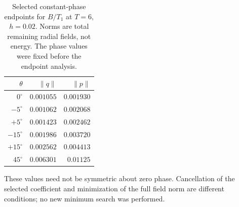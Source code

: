 \begin{table}[htbp]\centering\small
\caption{Selected constant-phase endpoints for $B/T_1$ at $T=6$,
$h=0.02$. Norms are total remaining radial fields, not energy.
The phase values were fixed before the endpoint analysis.}
\label{tab:phase-selected}
\begin{tabular}{rrr}\toprule
$\theta$&$\|q\|$&$\|p\|$\\\midrule
$0^\circ$&$0.001055$&$0.001930$\\
$-5^\circ$&$0.001062$&$0.002068$\\
$+5^\circ$&$0.001423$&$0.002462$\\
$-15^\circ$&$0.001986$&$0.003720$\\
$+15^\circ$&$0.002562$&$0.004413$\\
$45^\circ$&$0.006301$&$0.01125$\\\bottomrule
\end{tabular}
\end{table}
These values need not be symmetric about zero phase. Cancellation of the
selected coefficient and minimization of the full field norm are different
conditions; no new minimum search was performed.

